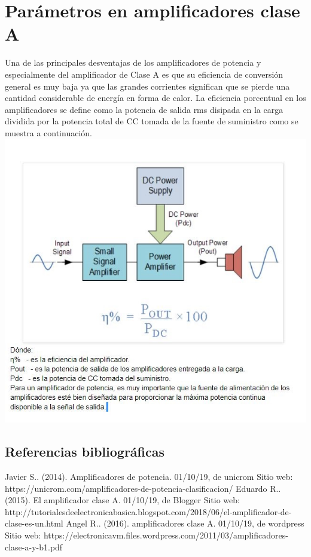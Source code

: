 \documentclass[12pt,a4paper]{article}
\begin{document}
\section{Parámetros en amplificadores clase A}
\begin{flushleft}
Una de las principales desventajas de los amplificadores de potencia y especialmente del amplificador de Clase A es que su eficiencia de conversión general es muy baja ya que las grandes corrientes significan que se pierde una cantidad considerable de energía en forma de calor. La eficiencia porcentual en los amplificadores se define como la potencia de salida rms disipada en la carga dividida por la potencia total de CC tomada de la fuente de suministro como se muestra a continuación.\linebreak
\includegraphics[scale=1]{imagenes/parametros.JPG} 
\newpage
\begin{flushleft}
\section{Referencias bibliográficas}
Javier S.. (2014). Amplificadores de potencia. 01/10/19, de unicrom Sitio web: https://unicrom.com/amplificadores-de-potencia-clasificacion/
\linebreak
\linebreak
Eduardo R.. (2015). El amplificador clase A. 01/10/19, de Blogger Sitio web: http://tutorialesdeelectronicabasica.blogspot.com/2018/06/el-amplificador-de-clase-es-un.html
\linebreak
\linebreak
Angel R.. (2016). amplificadores clase A. 01/10/19, de wordpress Sitio web: https://electronicavm.files.wordpress.com/2011/03/amplificadores-clase-a-y-b1.pdf
\end{flushleft}
\end{flushleft}
\end{document}
